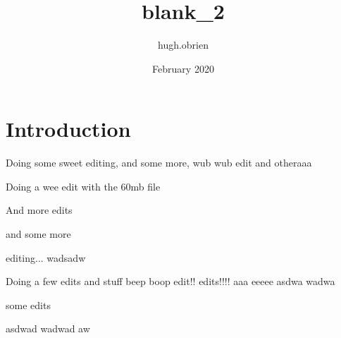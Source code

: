 \documentclass{article}
\title{blank_2}
\author{hugh.obrien }
\date{February 2020}
\begin{document}
\section{Introduction}
Doing some sweet editing, and some more, wub wub edit and otheraaa

Doing a wee edit with the 60mb file

And more edits

and some more

editing...
   wadsadw
   
   Doing a few edits and stuff  
beep boop edit!! edits!!!! aaa eeeee
asdwa wadwa 

some edits

asdwad wadwad aw
\end{document}
